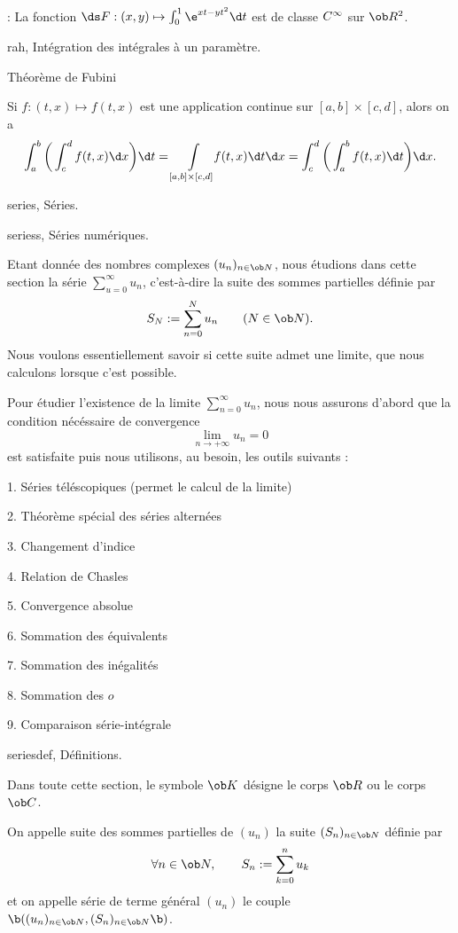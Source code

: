 \Application : La fonction $\ds F:(x,y)\mapsto\int_0^1\e^{xt-yt^2}\d t$ est de classe $\sc C^\infty$ sur $\ob R^2$. 
\bigskip



\Subsection rah, Intégration des intégrales à un paramètre. 
\medskip


\Concept Théorème de Fubini

\Theoreme [$a<b$ et $c<d$ dans $\ob R$] 
Si $f:(t,x)\mapsto f(t,x)$ est une application continue sur $[a,b]\times[c,d]$, alors on a 
$$
\int_a^b\bigg(\int_c^df(t,x)\d x\bigg)\d t=\int\limits_{[a,b]\times[c,d]}
\!\!f(t,x)\d t\d x=\int_c^d\bigg(\int_a^bf(t,x)\d t\bigg)\d x.
$$

\eject
{}%

\Chapter series, Séries. 

\Section seriess, Séries numériques. 

Etant donnée des nombres complexes $(u_n)_{n\in\ob N}$, nous étudions dans cette section la série $\sum_{u=0}^\infty u_n$, c'est-à-dire la suite des sommes partielles définie par  
$$
S_N:=\sum_{n=0}^Nu_n\qquad(N\in\ob N).
$$
Nous voulons essentiellement savoir si cette suite admet une limite, que  nous calculons lorsque c'est possible. 
\medskip

Pour étudier l'existence de la limite $\sum_{n=0}^\infty u_n$, nous nous assurons d'abord que  la condition nécéssaire de convergence   
$$
\lim_{n\to+\infty}u_n=0
$$
est satisfaite puis nous utilisons, au besoin, les outils suivants : 
\item{1.} Séries téléscopiques (permet le calcul de la limite)
\item{2.} Théorème spécial des séries alternées
\item{3.} Changement d'indice
\item{4.} Relation de Chasles
\item{5.} Convergence absolue
\item{6.} Sommation des équivalents
\item{7.} Sommation des inégalités
\item{8.} Sommation des $o$
\item{9.} Comparaison série-intégrale

\Subsection seriesdef, Définitions. 

Dans toute cette section, le symbole $\ob K$ désigne le corps $\ob R$ ou le corps $\ob C$. 
\bigskip

On appelle suite des sommes partielles de $(u_n)$ la suite $(S_n)_{n\in\ob N}$ définie par 
$$
\forall n\in\ob N, \qquad S_n:=\sum_{k=0}^nu_k
$$ 
et on appelle série de terme général $(u_n)$ le couple $\b((u_n)_{n\in\ob N},(S_n)_{n\in\ob N}\b)$. 
\bigskip

